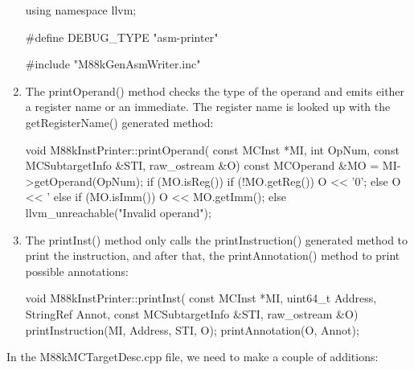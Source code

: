 \begin{enumerate}
\begin{cpp}
using namespace llvm;

#define DEBUG_TYPE "asm-printer"

#include "M88kGenAsmWriter.inc"
\end{cpp}

\item
The printOperand() method checks the type of the operand and emits either a register name or an immediate. The register name is looked up with the getRegisterName() generated method:

\begin{cpp}
void M88kInstPrinter::printOperand(
        const MCInst *MI, int OpNum,
        const MCSubtargetInfo &STI, raw_ostream &O) {
    const MCOperand &MO = MI->getOperand(OpNum);
    if (MO.isReg()) {
        if (!MO.getReg())
            O << '0';
        else
            O << '%
    } else if (MO.isImm())
        O << MO.getImm();
    else
        llvm_unreachable("Invalid operand");
}
\end{cpp}

\item
The printInst() method only calls the printInstruction() generated method to print the instruction, and after that, the printAnnotation() method to print possible annotations:

\begin{cpp}
void M88kInstPrinter::printInst(
        const MCInst *MI, uint64_t Address, StringRef Annot,
        const MCSubtargetInfo &STI, raw_ostream &O) {
    printInstruction(MI, Address, STI, O);
    printAnnotation(O, Annot);
}
\end{cpp}
\end{enumerate}


In the M88kMCTargetDesc.cpp file, we need to make a couple of additions:


